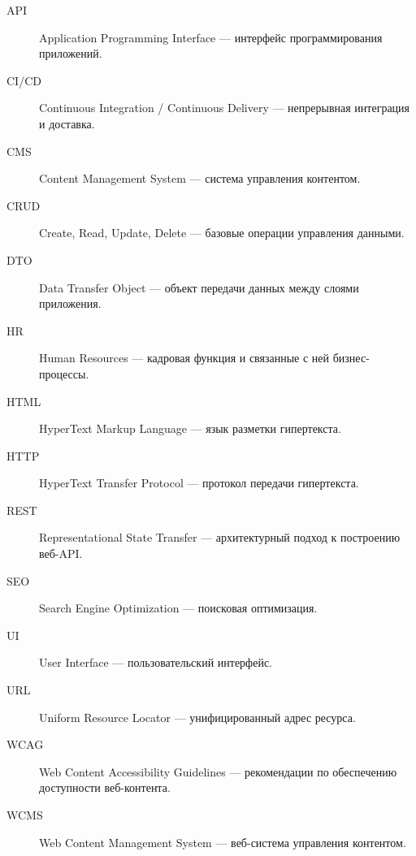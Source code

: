 \begin{description}
  \item[API] Application Programming Interface — интерфейс программирования приложений.
  \item[CI/CD] Continuous Integration / Continuous Delivery — непрерывная интеграция и доставка.
  \item[CMS] Content Management System — система управления контентом.
  \item[CRUD] Create, Read, Update, Delete — базовые операции управления данными.
  \item[DTO] Data Transfer Object — объект передачи данных между слоями приложения.
  \item[HR] Human Resources — кадровая функция и связанные с ней бизнес-процессы.
  \item[HTML] HyperText Markup Language — язык разметки гипертекста.
  \item[HTTP] HyperText Transfer Protocol — протокол передачи гипертекста.
  \item[REST] Representational State Transfer — архитектурный подход к построению веб-API.
  \item[SEO] Search Engine Optimization — поисковая оптимизация.
  \item[UI] User Interface — пользовательский интерфейс.
  \item[URL] Uniform Resource Locator — унифицированный адрес ресурса.
  \item[WCAG] Web Content Accessibility Guidelines — рекомендации по обеспечению доступности веб-контента.
  \item[WCMS] Web Content Management System — веб-система управления контентом.
\end{description}
